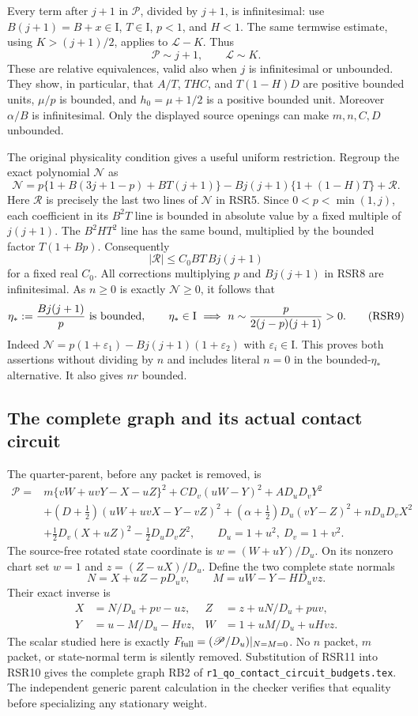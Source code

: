 Every term after $j+1$ in $\mathcal P$, divided by $j+1$, is
infinitesimal: use $B(j+1)=B+x\in\mathrm I$, $T\in\mathrm I$,
$p<1$, and $H<1$. The same termwise estimate, using
$K>(j+1)/2$, applies to $\mathcal L-K$. Thus
\[
 \mathcal P\sim j+1,\qquad \mathcal L\sim K.
 \tag{RSR7}
\]
These are relative equivalences, valid also when $j$ is infinitesimal
or unbounded. They show, in particular, that $A/T$, $THC$, and
$T(1-H)D$ are positive bounded units, $\mu/p$ is bounded, and
$h_0=\mu+1/2$ is a positive bounded unit. Moreover $\alpha/B$ is
infinitesimal. Only the displayed source openings can make $m,n,C,D$
unbounded.

The original physicality condition gives a useful uniform restriction.
Regroup the exact polynomial $\mathcal N$ as
\[
\mathcal N=p\{1+B(3j+1-p)+BT(j+1)\}
 -Bj(j+1)\{1+(1-H)T\}+\mathcal R.
 \tag{RSR8}
\]
Here $\mathcal R$ is precisely the last two lines of $\mathcal N$
in RSR5. Since $0<p<\min(1,j)$, each coefficient in its $B^2T$
line is bounded in absolute value by a fixed multiple of $j(j+1)$.
The $B^2HT^2$ line has the same bound, multiplied by the bounded
factor $T(1+Bp)$. Consequently
\[
 |\mathcal R|\leq C_0BT\,Bj(j+1)
\]
for a fixed real $C_0$. All corrections multiplying $p$ and
$Bj(j+1)$ in RSR8 are infinitesimal. As $n\geq0$ is exactly
$\mathcal N\geq0$, it follows that
\[
 \eta_*:=\frac{Bj(j+1)}p\ \hbox{is bounded},\qquad
 \eta_*\in\mathrm I\ \Longrightarrow\
 n\sim\frac{p}{2(j-p)(j+1)}>0.
 \tag{RSR9}
\]
Indeed $\mathcal N=p(1+\varepsilon_1)-Bj(j+1)(1+\varepsilon_2)$
with $\varepsilon_i\in\mathrm I$. This proves both assertions without
dividing by $n$ and includes literal $n=0$ in the bounded-$\eta_*$
alternative. It also gives $nr$ bounded.

\subsection{The complete graph and its actual contact circuit}

The quarter-parent, before any packet is removed, is
\begin{align*}
\mathscr P={}&m\{vW+uvY-X-uZ\}^2
 +CD_v(uW-Y)^2+AD_uD_vY^2\\
&+(D+\tfrac12)(uW+uvX-Y-vZ)^2
 +(\alpha+\tfrac12)D_u(vY-Z)^2+nD_uD_vX^2\\
&+\tfrac12D_v(X+uZ)^2-\tfrac12D_uD_vZ^2,
\qquad D_u=1+u^2,\ D_v=1+v^2.
 \tag{RSR10}
\end{align*}
The source-free rotated state coordinate is $w=(W+uY)/D_u$.
On its nonzero chart set $w=1$ and $z=(Z-uX)/D_u$. Define
the two complete state normals
\[
 N=X+uZ-pD_uv,\qquad M=uW-Y-HD_uvz.
\]
Their exact inverse is
\[
\begin{aligned}
 X&=N/D_u+pv-uz,& Z&=z+uN/D_u+puv,\\
 Y&=u-M/D_u-Hvz,& W&=1+uM/D_u+uHvz.
\end{aligned}
 \tag{RSR11}
\]
The scalar studied here is exactly
$F_{\rm full}=(\mathscr P/D_u)|_{N=M=0}$.
No $n$ packet, $m$ packet, or state-normal term is silently removed.
Substitution of RSR11 into RSR10 gives the complete graph RB2 of
\texttt{r1\_qo\_contact\_circuit\_budgets.tex}. The independent generic
parent calculation in the checker verifies that equality before
specializing any stationary weight.

